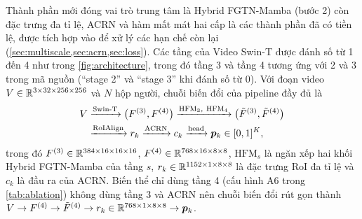 Thành phần mới đóng vai trò trung tâm là Hybrid FGTN-Mamba (bước 2) còn đặc trưng đa tỉ lệ, ACRN và hàm mất mát hai cấp là các thành phần đã có tiền lệ, được tích hợp vào để xử lý các hạn chế còn lại (\cref{sec:multiscale,sec:acrn,sec:loss}). Các tầng của Video Swin-T được đánh số từ 1 đến 4 như trong \cref{fig:architecture}, trong đó tầng 3 và tầng 4 tương ứng với  2 và 3 trong mã nguồn (``stage 2'' và ``stage 3'' khi đánh số từ 0). Với đoạn video $V \in \mathbb{R}^{3 \times 32 \times 256 \times 256}$ và $N$ hộp người, chuỗi biến đổi của pipeline đầy đủ là
\begin{equation}
\begin{aligned}
V &\xrightarrow{\text{Swin-T}} \big(F^{(3)}, F^{(4)}\big)
  \xrightarrow{\text{HFM}_3,\ \text{HFM}_4} \big(\tilde{F}^{(3)}, \tilde{F}^{(4)}\big)\\
  &\xrightarrow{\text{RoIAlign}} r_k
  \xrightarrow{\text{ACRN}} c_k
  \xrightarrow{\text{head}} \bm{p}_k \in [0,1]^{K},
\end{aligned}
\label{eq:flow}
\end{equation}
trong đó $F^{(3)} \in \mathbb{R}^{384 \times 16 \times 16 \times 16}$, $F^{(4)} \in \mathbb{R}^{768 \times 16 \times 8 \times 8}$, $\text{HFM}_s$ là ngăn xếp hai khối Hybrid FGTN-Mamba của tầng $s$, $r_k \in \mathbb{R}^{1152 \times 1 \times 8 \times 8}$ là đặc trưng RoI đa tỉ lệ và $c_k$ là đầu ra của ACRN. Biến thể chỉ dùng tầng 4 (cấu hình A6 trong \cref{tab:ablation}) không dùng tầng 3 và ACRN nên chuỗi biến đổi rút gọn thành $V \rightarrow F^{(4)} \rightarrow \tilde{F}^{(4)} \rightarrow r_k \in \mathbb{R}^{768 \times 1 \times 8 \times 8} \rightarrow \bm{p}_k$.

